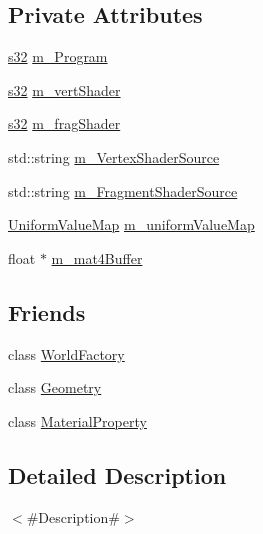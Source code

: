 \subsection*{Private Attributes}
\begin{DoxyCompactItemize}
\item 
\mbox{\hyperlink{_util_8h_aa62c75d314a0d1f37f79c4b73b2292e2}{s32}} \mbox{\hyperlink{classnjli_1_1_shader_program_a8391542fc26ae41466b6fe713a5ded2f}{m\+\_\+\+Program}}
\item 
\mbox{\hyperlink{_util_8h_aa62c75d314a0d1f37f79c4b73b2292e2}{s32}} \mbox{\hyperlink{classnjli_1_1_shader_program_a8f1c16c8132f6680d0fd8e7cd0f53ad9}{m\+\_\+vert\+Shader}}
\item 
\mbox{\hyperlink{_util_8h_aa62c75d314a0d1f37f79c4b73b2292e2}{s32}} \mbox{\hyperlink{classnjli_1_1_shader_program_a9b528190f997c332ccd7f4605a2ba5c7}{m\+\_\+frag\+Shader}}
\item 
std\+::string \mbox{\hyperlink{classnjli_1_1_shader_program_a36b6891a72ec4e6f7ee89add79884282}{m\+\_\+\+Vertex\+Shader\+Source}}
\item 
std\+::string \mbox{\hyperlink{classnjli_1_1_shader_program_aa1e64cb2fabffbafbff9f7c707672643}{m\+\_\+\+Fragment\+Shader\+Source}}
\item 
\mbox{\hyperlink{classnjli_1_1_shader_program_a36ecea1b480769cf2a125e5fb13f122a}{Uniform\+Value\+Map}} \mbox{\hyperlink{classnjli_1_1_shader_program_a20e228a576a90ddd2e232fa490cde560}{m\+\_\+uniform\+Value\+Map}}
\item 
float $\ast$ \mbox{\hyperlink{classnjli_1_1_shader_program_a2de7645fd10fecfe9bd3e128984c93e7}{m\+\_\+mat4\+Buffer}}
\end{DoxyCompactItemize}
\subsection*{Friends}
\begin{DoxyCompactItemize}
\item 
class \mbox{\hyperlink{classnjli_1_1_shader_program_acb96ebb09abe8f2a37a915a842babfac}{World\+Factory}}
\item 
class \mbox{\hyperlink{classnjli_1_1_shader_program_a9aca7b7350e6ffa0e2d6320834ad1857}{Geometry}}
\item 
class \mbox{\hyperlink{classnjli_1_1_shader_program_ae7c7f3376b81514442fbc2a5fe2f5ec9}{Material\+Property}}
\end{DoxyCompactItemize}


\subsection{Detailed Description}
$<$\#\+Description\#$>$ 

